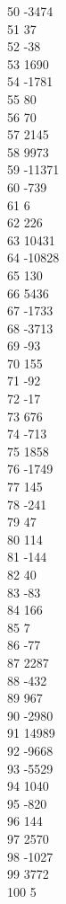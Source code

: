 { 50	-3474 \\
 51	37 \\
 52	-38 \\
 53	1690 \\
 54	-1781 \\
 55	80 \\
 56	70 \\
 57	2145 \\
 58	9973 \\
 59	-11371 \\
 60	-739 \\
 61	6 \\
 62	226 \\
 63	10431 \\
 64	-10828 \\
 65	130 \\
 66	5436 \\
 67	-1733 \\
 68	-3713 \\
 69	-93 \\
 70	155 \\
 71	-92 \\
 72	-17 \\
 73	676 \\
 74	-713 \\
 75	1858 \\
 76	-1749 \\
 77	145 \\
 78	-241 \\
 79	47 \\
 80	114 \\
 81	-144 \\
 82	40 \\
 83	-83 \\
 84	166 \\
 85	7 \\
 86	-77 \\
 87	2287 \\
 88	-432 \\
 89	967 \\
 90	-2980 \\
 91	14989 \\
 92	-9668 \\
 93	-5529 \\
 94	1040 \\
 95	-820 \\
 96	144 \\
 97	2570 \\
 98	-1027 \\
 99	3772 \\
 100	5 \\
}
